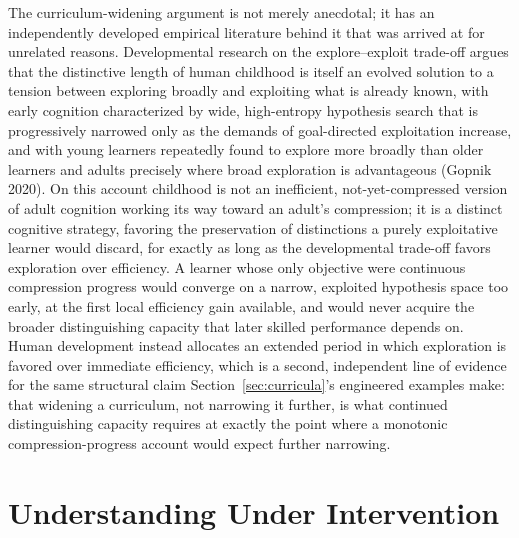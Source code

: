 \documentclass[11pt]{article}
\theoremstyle{plain}
\begin{document}
The curriculum-widening argument is not merely anecdotal; it has an independently developed empirical literature behind it that was arrived at for unrelated reasons. Developmental research on the explore--exploit trade-off argues that the distinctive length of human childhood is itself an evolved solution to a tension between exploring broadly and exploiting what is already known, with early cognition characterized by wide, high-entropy hypothesis search that is progressively narrowed only as the demands of goal-directed exploitation increase, and with young learners repeatedly found to explore more broadly than older learners and adults precisely where broad exploration is advantageous (Gopnik 2020). On this account childhood is not an inefficient, not-yet-compressed version of adult cognition working its way toward an adult's compression; it is a distinct cognitive strategy, favoring the preservation of distinctions a purely exploitative learner would discard, for exactly as long as the developmental trade-off favors exploration over efficiency. A learner whose only objective were continuous compression progress would converge on a narrow, exploited hypothesis space too early, at the first local efficiency gain available, and would never acquire the broader distinguishing capacity that later skilled performance depends on. Human development instead allocates an extended period in which exploration is favored over immediate efficiency, which is a second, independent line of evidence for the same structural claim Section~\ref{sec:curricula}'s engineered examples make: that widening a curriculum, not narrowing it further, is what continued distinguishing capacity requires at exactly the point where a monotonic compression-progress account would expect further narrowing.

\section{Understanding Under Intervention}
\label{sec:intervention}
\end{document}
